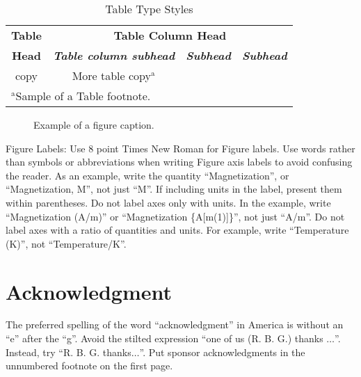 \documentclass[conference]{IEEEtran}
\begin{document}
\begin{table}[htbp]
\caption{Table Type Styles}
\begin{center}
\begin{tabular}{|c|c|c|c|}
\hline
\textbf{Table}&\multicolumn{3}{|c|}{\textbf{Table Column Head}} \\
\cline{2-4} 
\textbf{Head} & \textbf{\textit{Table column subhead}}& \textbf{\textit{Subhead}}& \textbf{\textit{Subhead}} \\
\hline
copy& More table copy$^{\mathrm{a}}$& &  \\
\hline
\multicolumn{4}{l}{$^{\mathrm{a}}$Sample of a Table footnote.}
\end{tabular}
\label{tab1}
\end{center}
\end{table}

\begin{figure}[htbp]
\caption{Example of a figure caption.}
\label{fig}
\end{figure}

Figure Labels: Use 8 point Times New Roman for Figure labels. Use words 
rather than symbols or abbreviations when writing Figure axis labels to 
avoid confusing the reader. As an example, write the quantity 
``Magnetization'', or ``Magnetization, M'', not just ``M''. If including 
units in the label, present them within parentheses. Do not label axes only 
with units. In the example, write ``Magnetization (A/m)'' or ``Magnetization 
\{A[m(1)]\}'', not just ``A/m''. Do not label axes with a ratio of 
quantities and units. For example, write ``Temperature (K)'', not 
``Temperature/K''.

\section*{Acknowledgment}

The preferred spelling of the word ``acknowledgment'' in America is without 
an ``e'' after the ``g''. Avoid the stilted expression ``one of us (R. B. 
G.) thanks $\ldots$''. Instead, try ``R. B. G. thanks$\ldots$''. Put sponsor 
acknowledgments in the unnumbered footnote on the first page.

\printbibliography
\end{document}
